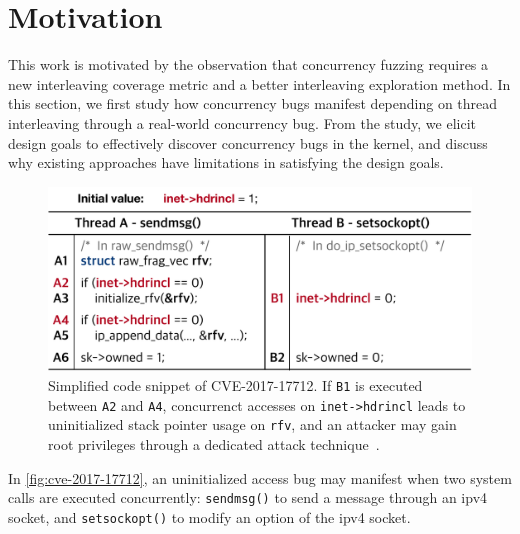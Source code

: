\section{Motivation}
\label{s:motivation}


This work is motivated by the observation that concurrency fuzzing
requires a new interleaving coverage metric and a better interleaving
exploration method.
%
In this section, we first study how concurrency bugs manifest
depending on thread interleaving through a real-world concurrency bug.
From the study, we elicit design goals to effectively discover
concurrency bugs in the kernel, and discuss why existing approaches
have limitations in satisfying the design goals.

%

%
\begin{figure}[t]
  \centering
  \includegraphics[width=0.85\linewidth]{fig/cve-2017-10661.pdf}
  \caption{Simplified code snippet of CVE-2017-17712. If \texttt{B1}
    is executed between \texttt{A2} and \texttt{A4}, concurrenct
    accesses on \texttt{inet->hdrincl} leads to uninitialized stack
    pointer usage on \texttt{rfv}, and an attacker may gain root
    privileges through a dedicated attack
    technique~\cite{stackspray}.}
  \label{fig:cve-2017-17712}
\end{figure}
%
In \autoref{fig:cve-2017-17712}, an uninitialized access bug may
manifest when two system calls are executed concurrently:
\texttt{sendmsg()} to send a message through an ipv4 socket, and
\texttt{setsockopt()} to modify an option of the ipv4 socket.

